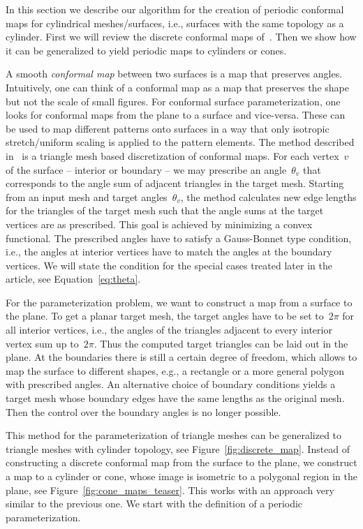 \documentclass[Thesis.tex]{subfiles}
\begin{document}
In this section we describe our algorithm for the creation of periodic
conformal maps for cylindrical meshes/surfaces, i.e., surfaces with
the same topology as a cylinder. First we will review the discrete
conformal maps of~\cite{Springborn2008}. Then we show how it can be generalized
to yield periodic maps to cylinders or cones.

A smooth \emph{conformal map} between two surfaces is a map that
preserves angles. Intuitively, one can think of a conformal map as a
map that preserves the shape but not the scale of small figures. For
conformal surface parameterization, one looks for conformal
maps from the plane to a surface and vice-versa. These can be used to 
map different patterns onto surfaces in a way that only isotropic
stretch/uniform scaling is applied to the pattern elements.
%
The method described in~\cite{Springborn2008} is a triangle mesh based
discretization of conformal maps. For each vertex~$v$ of
the surface -- interior or boundary -- we may prescribe an
angle~$\theta_v$ that corresponds to the angle sum of adjacent
triangles in the target mesh.  Starting from an input mesh and target
angles~$\theta_v$, the method calculates new edge lengths for the
triangles of the target mesh such that the angle sums at the target
vertices are as prescribed. This goal is achieved by minimizing a
convex functional.  
%
The prescribed angles have to satisfy a Gauss-Bonnet type condition,
i.e., the angles at interior vertices have to match the angles at the
boundary vertices.  We will state the condition for the special cases
treated later in the article, see Equation~\eqref{eq:theta}.

For the parameterization problem, we want to construct a map from a
surface to the plane. To get a planar target mesh, the target angles
have to be set to~$2\pi$ for all interior vertices, i.e., the angles
of the triangles adjacent to every interior vertex sum up
to~$2\pi$. Thus the computed target triangles can be laid out in the
plane. At the boundaries there is still a certain degree of freedom,
which allows to map the surface to different shapes, e.g., a rectangle
or a more general polygon with prescribed angles. 
%
An alternative choice of boundary conditions yields a target mesh
whose boundary edges have the same lengths as the original mesh. Then
the control over the boundary angles is no longer possible.

This method for the parameterization of triangle meshes can be generalized
to triangle meshes with cylinder topology, see Figure~\ref{fig:discrete_map}. 
Instead of constructing a discrete conformal map from the
surface to the plane, we construct a map to a cylinder or cone, whose image
is isometric to a polygonal region in the plane, see Figure~\ref{fig:cone_maps_teaser}. 
This works with an approach very similar to the previous one. We start 
with the definition of a periodic parameterization.
\end{document}

